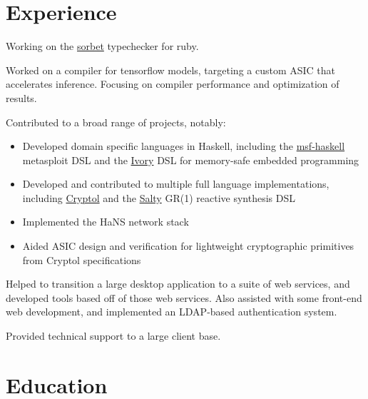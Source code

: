 \documentclass[letter,10pt]{moderncv}
\begin{document}
\makecvtitle

\section{Experience}

  {}{Working on the \href{https://sorbet.org}{sorbet} typechecker for ruby.}

  {}{Worked on a compiler for tensorflow models, targeting a custom ASIC
  that accelerates inference. Focusing on compiler performance and optimization
  of results.}

  {}{Contributed to a broad range of projects, notably:
  \begin{itemize}%
  \item Developed domain specific languages in Haskell, including the
    \href{https://github.com/galoisinc/msf-haskell}{msf-haskell} metasploit DSL
    and the \href{https://github.com/galoisinc/ivory}{Ivory} DSL for memory-safe
    embedded programming
  \item Developed and contributed to multiple full language implementations,
    including \href{https://github.com/galoisinc/cryptol}{Cryptol} and the
    \href{https://github.com/galoisinc/salty}{Salty} GR(1) reactive synthesis DSL
  \item Implemented the HaNS network stack
  \item Aided ASIC design and verification for lightweight cryptographic
    primitives from Cryptol specifications
  \end{itemize}}

  {}{Helped to transition a large desktop application to a suite of web
  services, and developed tools based off of those web services. Also assisted
  with some front-end web development, and implemented an LDAP-based
  authentication system.}

  {}{Provided technical support to a large client base.}

\section{Education}

\end{document}
